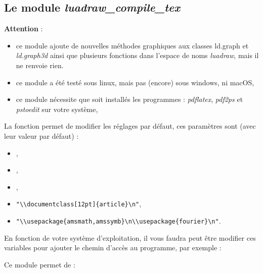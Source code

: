 \subsection{Le module \emph{luadraw\_compile\_tex}}

\textbf{Attention} : 
\begin{itemize}
    \item ce module ajoute de nouvelles méthodes graphiques aux classes {ld.graph} et \emph{ld.graph3d} ainsi que plusieurs fonctions dans l'espace de noms \emph{luadraw}, mais il ne renvoie rien.
    \item ce module a été testé sous linux, mais pas (encore) sous windows, ni macOS,
    \item ce module nécessite que soit installés les programmes : \emph{pdflatex}, \emph{pdf2ps} et \emph{pstoedit} sur votre système,
\end{itemize}

La fonction  permet de modifier les réglages par défaut, ces paramètres sont (avec leur valeur par défaut) :
\begin{itemize}
    \item {},
    \item {},
    \item {},
    \item {}\verb|"\\documentclass[12pt]{article}\n"|,
    \item {}\verb|"\\usepackage{amsmath,amssymb}\n\\usepackage{fourier}\n"|.
\end{itemize}

En fonction de votre système d'exploitation, il vous faudra peut être modifier ces variables pour ajouter le chemin d'accès au programme, par exemple : 


Ce module permet de :


